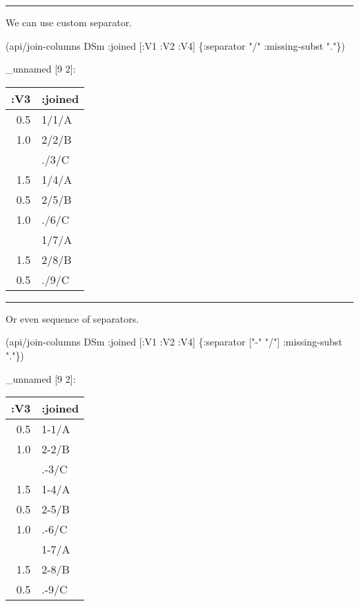 \documentclass[]{article}
\newenvironment{Shaded}{\begin{snugshade}}{\end{snugshade}}
\newcommand{\StringTok}[1]{\textcolor[rgb]{0.31,0.60,0.02}{#1}}
\newcommand{\AttributeTok}[1]{\textcolor[rgb]{0.77,0.63,0.00}{#1}}
\newcommand{\NormalTok}[1]{#1}
\begin{document}
\begin{center}\rule{0.5\linewidth}{0.5pt}\end{center}

We can use custom separator.

\begin{Shaded}
\begin{Highlighting}[]
\NormalTok{(api/join-columns DSm }\AttributeTok{:joined}\NormalTok{ [}\AttributeTok{:V1} \AttributeTok{:V2} \AttributeTok{:V4}\NormalTok{] \{}\AttributeTok{:separator} \StringTok{"/"}
                                             \AttributeTok{:missing-subst} \StringTok{"."}\NormalTok{\})}
\end{Highlighting}
\end{Shaded}

\_unnamed {[}9 2{]}:

\begin{longtable}[]{@{}rl@{}}
\toprule
:V3 & :joined\tabularnewline
\midrule
\endhead
0.5 & 1/1/A\tabularnewline
1.0 & 2/2/B\tabularnewline
& ./3/C\tabularnewline
1.5 & 1/4/A\tabularnewline
0.5 & 2/5/B\tabularnewline
1.0 & ./6/C\tabularnewline
& 1/7/A\tabularnewline
1.5 & 2/8/B\tabularnewline
0.5 & ./9/C\tabularnewline
\bottomrule
\end{longtable}

\begin{center}\rule{0.5\linewidth}{0.5pt}\end{center}

Or even sequence of separators.

\begin{Shaded}
\begin{Highlighting}[]
\NormalTok{(api/join-columns DSm }\AttributeTok{:joined}\NormalTok{ [}\AttributeTok{:V1} \AttributeTok{:V2} \AttributeTok{:V4}\NormalTok{] \{}\AttributeTok{:separator}\NormalTok{ [}\StringTok{"-"} \StringTok{"/"}\NormalTok{]}
                                             \AttributeTok{:missing-subst} \StringTok{"."}\NormalTok{\})}
\end{Highlighting}
\end{Shaded}

\_unnamed {[}9 2{]}:

\begin{longtable}[]{@{}rl@{}}
\toprule
:V3 & :joined\tabularnewline
\midrule
\endhead
0.5 & 1-1/A\tabularnewline
1.0 & 2-2/B\tabularnewline
& .-3/C\tabularnewline
1.5 & 1-4/A\tabularnewline
0.5 & 2-5/B\tabularnewline
1.0 & .-6/C\tabularnewline
& 1-7/A\tabularnewline
1.5 & 2-8/B\tabularnewline
0.5 & .-9/C\tabularnewline
\bottomrule
\end{longtable}
\end{document}
